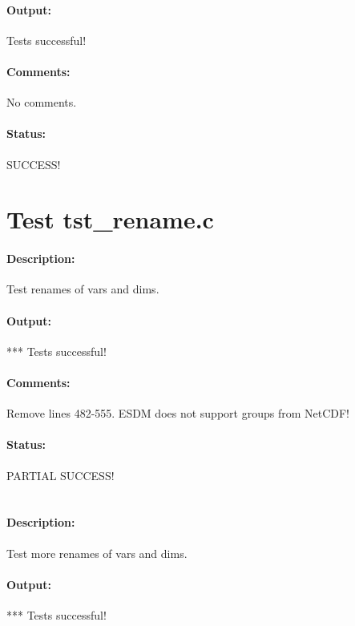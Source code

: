 \paragraph{Output:} Tests successful!

\paragraph{Comments:} No comments.

\paragraph{Status:} SUCCESS!

\section{Test tst\_rename.c}

\paragraph{Description:} Test renames of vars and dims.

\paragraph{Output:} *** Tests successful!

\paragraph{Comments:} Remove lines 482-555. ESDM does not support groups from NetCDF!

\paragraph{Status:} PARTIAL SUCCESS!

\section{}

\paragraph{Description:} Test more renames of vars and dims.

\paragraph{Output:} *** Tests successful!

